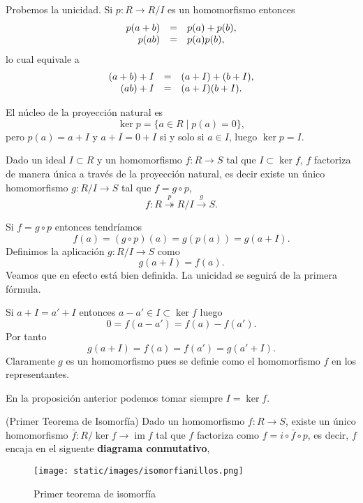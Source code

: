 Probemos la unicidad. Si \(p\colon R\rightarrow R/I\) es un homomorfismo
entonces \[\begin{array}{rcl}
p(a+b)&=&p(a)+p(b),\cr p(ab)&=&p(a)p(b),
\end{array}\] lo cual equivale a \[\begin{array}{rcl}
(a+b)+I&=&(a+I)+(b+I),\cr (ab)+I&=&(a+I)(b+I).
\end{array}\]

El núcleo de la proyección natural es
\[\ker p =\{a\in R\;|\; p(a)=0\},\] pero \(p(a)=a+I\) y \(a+I=0+I\) si
y solo si \(a\in I\), luego \(\ker p=I\).\\

\label{factorquotient} Dado un ideal \(I\subset R\) y
un homomorfismo \(f\colon R\rightarrow S\) tal que \(I\subset \ker f\),
\(f\) factoriza de manera única a través de la proyección natural, es
decir existe un único homomorfismo \(g\colon R/I\rightarrow S\) tal que
\(f=g\circ p\),
\[f\colon R\stackrel{p}\twoheadrightarrow R/I\stackrel{g}\rightarrow S.\]


Si \(f=g\circ p\) entonces tendríamos
\[f(a)=(g\circ p)(a)=g(p(a))=g(a+I).\] Definimos la aplicación
\(g\colon R/I\rightarrow S\) como \[g(a+I)=f(a).\] Veamos que en efecto
está bien definida. La unicidad se seguirá de la primera fórmula.

Si \(a+I=a'+I\) entonces \(a-a'\in I\subset\ker f\) luego
\[0=f(a-a')=f(a)-f(a').\] Por tanto \[g(a+I)=f(a)=f(a')=g(a'+I).\]
Claramente \(g\) es un homomorfismo pues se definie como el homomorfismo
\(f\) en los representantes.\\


En la proposición anterior podemos tomar siempre \(I=\ker f\).

\textrm{\normalfont (Primer Teorema de Isomorfía)}\label{primer}
Dado un homomorfismo \(f\colon R\rightarrow S\), existe un único
homomorfismo \(\bar f\colon R/\ker f\rightarrow \operatorname{im}f\) tal
que \(f\) factoriza como \(f=i\circ\bar f\circ p\), es decir, \(f\)
encaja en el siguente \textbf{diagrama conmutativo},

\begin{figure}
\centering
\texttt{[image: static/images/isomorfianillos.png]}
\caption{Primer teorema de isomorfía}
\end{figure}

